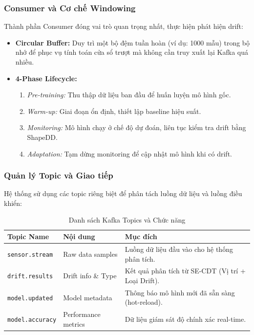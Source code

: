 \subsubsection{Consumer và Cơ chế Windowing}
Thành phần Consumer đóng vai trò quan trọng nhất, thực hiện phát hiện drift:
\begin{itemize}
	\item \textbf{Circular Buffer:} Duy trì một bộ đệm tuần hoàn (ví dụ: 1000 mẫu) trong bộ nhớ để phục vụ tính toán cửa sổ trượt mà không cần truy xuất lại Kafka quá nhiều.
	\item \textbf{4-Phase Lifecycle:}
	      \begin{enumerate}
		      \item \textit{Pre-training:} Thu thập dữ liệu ban đầu để huấn luyện mô hình gốc.
		      \item \textit{Warm-up:} Giai đoạn ổn định, thiết lập baseline hiệu suất.
		      \item \textit{Monitoring:} Mô hình chạy ở chế độ dự đoán, liên tục kiểm tra drift bằng ShapeDD.
		      \item \textit{Adaptation:} Tạm dừng monitoring để cập nhật mô hình khi có drift.
	      \end{enumerate}
\end{itemize}

\subsubsection{Quản lý Topic và Giao tiếp}
Hệ thống sử dụng các topic riêng biệt để phân tách luồng dữ liệu và luồng điều khiển:
\begin{table}[H]
	\centering
	\caption{Danh sách Kafka Topics và Chức năng}
	\label{tab:kafka-topics}
	\begin{tabular}{|l|l|l|}
		\hline
		\textbf{Topic Name}     & \textbf{Nội dung}   & \textbf{Mục đích}                               \\
		\hline
		\texttt{sensor.stream}  & Raw data samples    & Luồng dữ liệu đầu vào cho hệ thống phân tích.   \\
		\hline
		\texttt{drift.results}  & Drift info \& Type  & Kết quả phân tích từ SE-CDT (Vị trí + Loại Drift). \\
		\hline
		\texttt{model.updated}  & Model metadata      & Thông báo mô hình mới đã sẵn sàng (hot-reload). \\
		\hline
		\texttt{model.accuracy} & Performance metrics & Dữ liệu giám sát độ chính xác real-time.        \\
		\hline
	\end{tabular}
\end{table}

